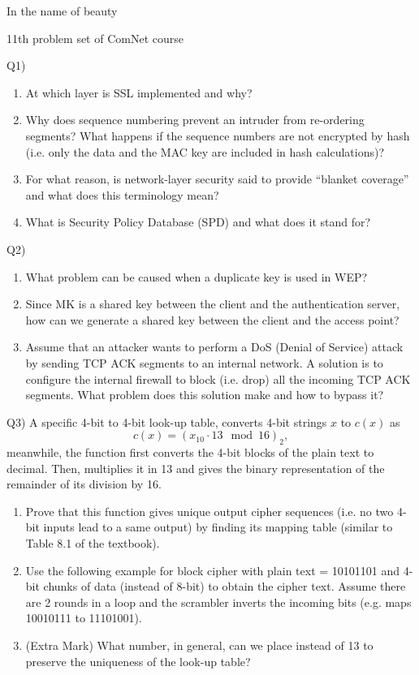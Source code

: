 \documentclass[10pt,letterpaper]{article}
\begin{document}
\Large
\begin{center}
In the name of beauty

11th problem set of ComNet course

\hrulefill
\end{center}
Q1) 
\begin{enumerate}[label=\alph*-]
\item
At which layer is SSL implemented and why?
\item
Why does sequence numbering prevent an intruder from re-ordering segments? What happens if the sequence numbers are not encrypted by hash (i.e. only the data and the MAC key are included in hash calculations)?
\item
For what reason, is network-layer security said to provide “blanket coverage” and what does this terminology mean?
\item
What is Security Policy Database (SPD) and what does it stand for?
\end{enumerate}

Q2) 
\begin{enumerate}[label=\alph*-]
\item
What problem can be caused when a duplicate key is used in WEP?
\item
Since MK is a shared key between the client and the authentication server, how can we generate a shared key between the client and the access point?
\item
Assume that an attacker wants to perform a DoS (Denial of Service) attack by sending TCP ACK segments to an internal network. A solution is to configure the internal firewall to block (i.e. drop) all the incoming TCP ACK segments. What problem does this solution make and how to bypass it?
\end{enumerate}

Q3) A specific 4-bit to 4-bit look-up table, converts 4-bit strings $x$ to $c(x)$ as $$c(x)=(x_{10}\cdot 13\mod 16)_2,$$meanwhile, the function first converts the 4-bit blocks of the plain text to decimal. Then, multiplies it in 13 and gives the binary representation of the remainder of its division by 16.

\begin{enumerate}[label=\alph*-]
\item
Prove that this function gives unique output cipher sequences (i.e. no two 4-bit inputs lead to a same output) by finding its mapping table (similar to Table 8.1 of the textbook).
\item
Use the following example for block cipher with plain text = 10101101 and 4-bit chunks of data (instead of 8-bit) to obtain the cipher text. Assume there are 2 rounds in a loop and the scrambler inverts the incoming bits (e.g. maps 10010111 to 11101001).
\item
(Extra Mark) What number, in general, can we place instead of 13 to preserve the uniqueness of the look-up table?
\end{enumerate}
\end{document}

